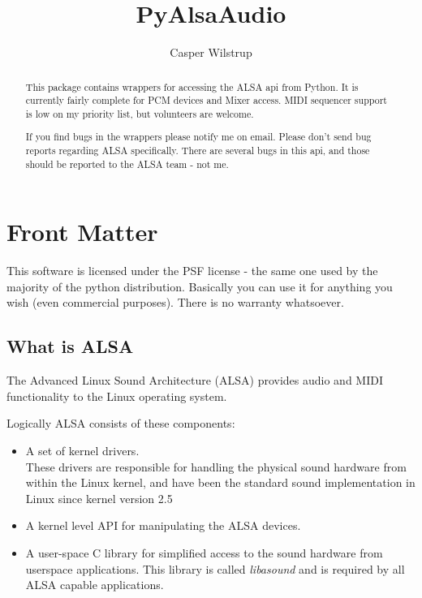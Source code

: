 \documentclass{howto}
\title{PyAlsaAudio}
\author{Casper Wilstrup}
\begin{document}
\maketitle

%
\ifhtml
\chapter*{Front Matter\label{front}}
\fi

This software is licensed under the PSF license - the same one used
by the majority of the python distribution. Basically you can use it
for anything you wish (even commercial purposes). There is no warranty
whatsoever.

\begin{abstract}
\noindent
This package contains wrappers for accessing the ALSA api from Python. It
is currently fairly complete for PCM devices and Mixer access. MIDI sequencer
support is low on my priority list, but volunteers are welcome.

If you find bugs in the wrappers please notify me on email. Please
don't send bug reports regarding ALSA specifically. There are several
bugs in this api, and those should be reported to the ALSA team - not
me.
\end{abstract}

\tableofcontents

\section{What is ALSA}

The Advanced Linux Sound Architecture (ALSA) provides audio and MIDI
functionality to the Linux operating system. 

Logically ALSA consists of these components:
\begin{itemize}
  \item A set of kernel drivers.\\
        These drivers are responsible for handling the physical sound 
        hardware from within the Linux kernel, and have been the standard
        sound implementation in Linux since kernel version 2.5
  \item A kernel level API for manipulating the ALSA devices.
  \item A user-space C library for simplified access to the sound hardware
        from userspace applications. This library is called \textit{libasound}
        and is required by all ALSA capable applications.
\end{itemize}
\end{document}
